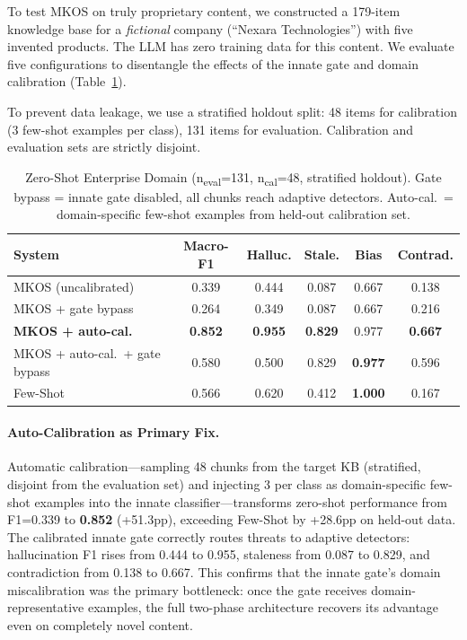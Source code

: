 \documentclass[11pt]{article}
\begin{document}
To test MKOS on truly proprietary content, we constructed a 179-item knowledge base for a \emph{fictional} company (``Nexara Technologies'') with five invented products. The LLM has zero training data for this content. We evaluate five configurations to disentangle the effects of the innate gate and domain calibration (Table~\ref{tab:zeroshot}).

To prevent data leakage, we use a stratified holdout split: 48 items for calibration (3 few-shot examples per class), 131 items for evaluation. Calibration and evaluation sets are strictly disjoint.

\begin{table}[h]
\centering
\caption{Zero-Shot Enterprise Domain (n\textsubscript{eval}=131, n\textsubscript{cal}=48, stratified holdout). Gate bypass = innate gate disabled, all chunks reach adaptive detectors. Auto-cal.\ = domain-specific few-shot examples from held-out calibration set.}
\label{tab:zeroshot}
\begin{tabular}{lccccc}
\toprule
\textbf{System} & \textbf{Macro-F1} & \textbf{Halluc.} & \textbf{Stale.} & \textbf{Bias} & \textbf{Contrad.} \\
\midrule
MKOS (uncalibrated) & 0.339 & 0.444 & 0.087 & 0.667 & 0.138 \\
MKOS + gate bypass & 0.264 & 0.349 & 0.087 & 0.667 & 0.216 \\
\textbf{MKOS + auto-cal.} & \textbf{0.852} & \textbf{0.955} & \textbf{0.829} & 0.977 & \textbf{0.667} \\
MKOS + auto-cal.\ + gate bypass & 0.580 & 0.500 & 0.829 & \textbf{0.977} & 0.596 \\
Few-Shot & 0.566 & 0.620 & 0.412 & \textbf{1.000} & 0.167 \\
\bottomrule
\end{tabular}
\end{table}

\paragraph{Auto-Calibration as Primary Fix.} Automatic calibration---sampling 48 chunks from the target KB (stratified, disjoint from the evaluation set) and injecting 3 per class as domain-specific few-shot examples into the innate classifier---transforms zero-shot performance from F1=0.339 to \textbf{0.852} (+51.3pp), exceeding Few-Shot by +28.6pp on held-out data. The calibrated innate gate correctly routes threats to adaptive detectors: hallucination F1 rises from 0.444 to 0.955, staleness from 0.087 to 0.829, and contradiction from 0.138 to 0.667. This confirms that the innate gate's domain miscalibration was the primary bottleneck: once the gate receives domain-representative examples, the full two-phase architecture recovers its advantage even on completely novel content.
\end{document}
